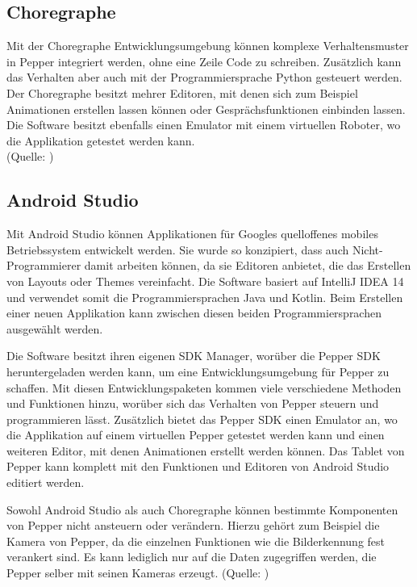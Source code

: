 \subsection{Choregraphe}

Mit der Choregraphe Entwicklungsumgebung können komplexe Verhaltensmuster in Pepper integriert werden, ohne eine Zeile Code zu schreiben. 
Zusätzlich kann das Verhalten aber auch mit der Programmiersprache Python gesteuert werden. Der Choregraphe besitzt mehrer Editoren, 
mit denen sich zum Beispiel Animationen erstellen lassen können oder Gesprächsfunktionen einbinden lassen. Die Software besitzt ebenfalls 
einen Emulator mit einem virtuellen Roboter, wo die Applikation getestet werden kann.\\
(Quelle: \cite{Choregraphe})\\

\subsection{Android Studio}

Mit Android Studio können Applikationen für Googles quelloffenes mobiles Betriebssystem entwickelt werden. Sie wurde so konzipiert, dass 
auch Nicht-Programmierer damit arbeiten können, da sie Editoren anbietet, die das Erstellen von Layouts oder Themes vereinfacht. 
Die Software basiert auf IntelliJ IDEA 14 und verwendet somit die Programmiersprachen Java und Kotlin. Beim Erstellen einer neuen 
Applikation kann zwischen diesen beiden Programmiersprachen ausgewählt werden.

Die Software besitzt ihren eigenen SDK Manager, worüber die Pepper SDK heruntergeladen werden kann, um eine Entwicklungsumgebung für Pepper 
zu schaffen. Mit diesen Entwicklungspaketen kommen viele verschiedene Methoden und Funktionen hinzu, worüber sich das Verhalten von Pepper 
steuern und programmieren lässt. Zusätzlich bietet das Pepper SDK einen Emulator an, wo die Applikation auf einem virtuellen Pepper 
getestet werden kann und einen weiteren Editor, mit denen Animationen erstellt werden können. Das Tablet von Pepper kann komplett mit den 
Funktionen und Editoren von Android Studio editiert werden. 

Sowohl Android Studio als auch Choregraphe können bestimmte Komponenten von Pepper nicht ansteuern oder verändern. Hierzu gehört zum 
Beispiel die Kamera von Pepper, da die einzelnen Funktionen wie die Bilderkennung fest verankert sind. Es kann lediglich nur auf die Daten 
zugegriffen werden, die Pepper selber mit seinen Kameras erzeugt.
(Quelle: \cite{Android_Studio})\\


